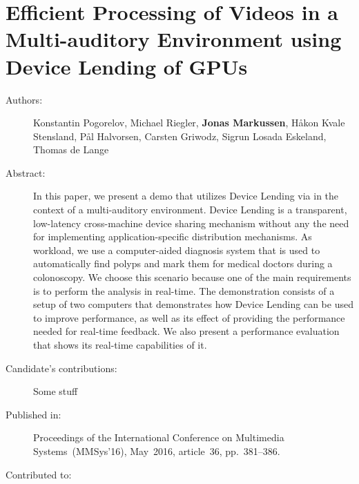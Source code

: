 \chapter{Efficient Processing of Videos in a Multi-auditory Environment using Device Lending of GPUs}
\label{paper:MMSys-2016}
\paperthumb

\begin{description}
	\item[Authors:]
	Konstantin Pogorelov, Michael Riegler, \textbf{Jonas Markussen}, H{\aa}kon Kvale Stensland,
	P{\aa}l Halvorsen, Carsten Griwodz, Sigrun Losada Eskeland, Thomas de Lange


	\item[Abstract:]
		In this paper, we present a demo that utilizes Device Lending 
		via  in the context of a multi-auditory
		environment. Device Lending is a transparent, low-latency
		cross-machine  device sharing mechanism without any
		the need for implementing application-specific distribution
		mechanisms. As workload, we use a computer-aided diagnosis 
		system that is used to automatically find polyps and
		mark them for medical doctors during a colonoscopy. We
		choose this scenario because one of the main requirements
		is to perform the analysis in real-time. The demonstration
		consists of a setup of two computers that demonstrates how
		Device Lending can be used to improve performance, as well
		as its effect of providing the performance needed for 
		real-time feedback. We also present a performance evaluation
		that shows its real-time capabilities of it.


	\item[Candidate's contributions:]
		Some stuff

	\item[Published in:]
	Proceedings of the International Conference on Multimedia Systems~(MMSys'16),
	May~2016, article~36, pp.~381--386.

	\item[Contributed to:]

\end{description}
